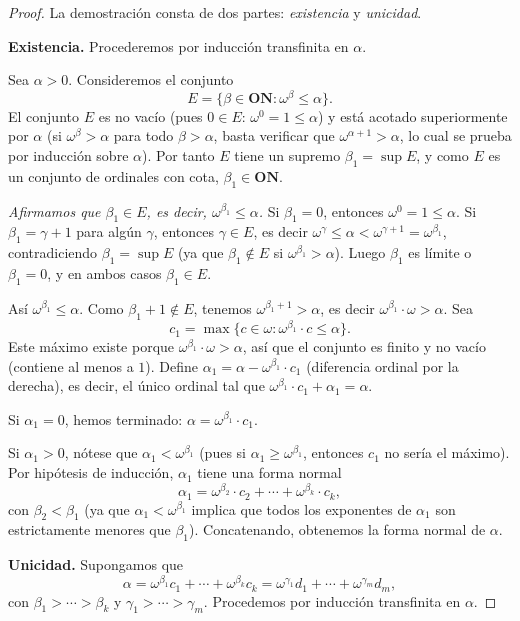 \begin{proof}
La demostración consta de dos partes: \emph{existencia} y \emph{unicidad}.

\medskip
\textbf{Existencia.} Procederemos por inducción transfinita en $\alpha$.

Sea $\alpha > 0$. Consideremos el conjunto
\[
  E = \{\beta \in \mathbf{ON} : \omega^\beta \leq \alpha\}.
\]
El conjunto $E$ es no vacío (pues $0 \in E$: $\omega^0 = 1 \leq \alpha$) y está acotado superiormente por $\alpha$ (si $\omega^\beta > \alpha$ para todo $\beta > \alpha$, basta verificar que $\omega^{\alpha+1} > \alpha$, lo cual se prueba por inducción sobre $\alpha$). Por tanto $E$ tiene un supremo $\beta_1 = \sup E$, y como $E$ es un conjunto de ordinales con cota, $\beta_1 \in \mathbf{ON}$.

\textit{Afirmamos que $\beta_1 \in E$, es decir, $\omega^{\beta_1} \leq \alpha$.}
Si $\beta_1 = 0$, entonces $\omega^0 = 1 \leq \alpha$. Si $\beta_1 = \gamma + 1$ para algún $\gamma$, entonces $\gamma \in E$, es decir $\omega^\gamma \leq \alpha < \omega^{\gamma+1} = \omega^{\beta_1}$, contradiciendo $\beta_1 = \sup E$ (ya que $\beta_1 \notin E$ si $\omega^{\beta_1} > \alpha$). Luego $\beta_1$ es límite o $\beta_1 = 0$, y en ambos casos $\beta_1 \in E$.

Así $\omega^{\beta_1} \leq \alpha$. Como $\beta_1+1 \notin E$, tenemos $\omega^{\beta_1+1} > \alpha$, es decir $\omega^{\beta_1} \cdot \omega > \alpha$. Sea
\[
  c_1 = \max\{c \in \omega : \omega^{\beta_1} \cdot c \leq \alpha\}.
\]
Este máximo existe porque $\omega^{\beta_1} \cdot \omega > \alpha$, así que el conjunto es finito y no vacío (contiene al menos a $1$). Define $\alpha_1 = \alpha - \omega^{\beta_1} \cdot c_1$ (diferencia ordinal por la derecha), es decir, el único ordinal tal que $\omega^{\beta_1} \cdot c_1 + \alpha_1 = \alpha$.

Si $\alpha_1 = 0$, hemos terminado: $\alpha = \omega^{\beta_1} \cdot c_1$.

Si $\alpha_1 > 0$, nótese que $\alpha_1 < \omega^{\beta_1}$ (pues si $\alpha_1 \geq \omega^{\beta_1}$, entonces $c_1$ no sería el máximo). Por hipótesis de inducción, $\alpha_1$ tiene una forma normal
\[
  \alpha_1 = \omega^{\beta_2} \cdot c_2 + \cdots + \omega^{\beta_k} \cdot c_k,
\]
con $\beta_2 < \beta_1$ (ya que $\alpha_1 < \omega^{\beta_1}$ implica que todos los exponentes de $\alpha_1$ son estrictamente menores que $\beta_1$). Concatenando, obtenemos la forma normal de $\alpha$.

\medskip
\textbf{Unicidad.} Supongamos que
\[
  \alpha = \omega^{\beta_1} c_1 + \cdots + \omega^{\beta_k} c_k
  = \omega^{\gamma_1} d_1 + \cdots + \omega^{\gamma_m} d_m,
\]
con $\beta_1 > \cdots > \beta_k$ y $\gamma_1 > \cdots > \gamma_m$. Procedemos por inducción transfinita en $\alpha$.


\end{proof}
